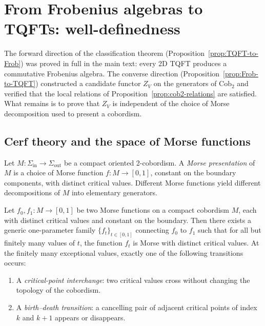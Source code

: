 
\label{app:frobenius}

\section{From Frobenius algebras to TQFTs: well-definedness}\label{appsec:frob-to-tqft}

The forward direction of the classification theorem (Proposition~\ref{prop:TQFT-to-Frob}) was proved in full in the main text: every 2D TQFT produces a commutative Frobenius algebra. The converse direction (Proposition~\ref{prop:Frob-to-TQFT}) constructed a candidate functor $Z_V$ on the generators of $\mathrm{Cob}_2$ and verified that the local relations of Proposition~\ref{prop:cob2-relations} are satisfied. What remains is to prove that $Z_V$ is independent of the choice of Morse decomposition used to present a cobordism.

\subsection{Cerf theory and the space of Morse functions}

Let $M : \Sigma_{\mathrm{in}} \to \Sigma_{\mathrm{out}}$ be a compact oriented 2-cobordism. A \emph{Morse presentation} of $M$ is a choice of Morse function $f : M \to [0,1]$, constant on the boundary components, with distinct critical values. Different Morse functions yield different decompositions of $M$ into elementary generators.

\begin{theorem}\label{thm:cerf}
Let $f_0, f_1 : M \to [0,1]$ be two Morse functions on a compact cobordism $M$, each with distinct critical values and constant on the boundary. Then there exists a generic one-parameter family $\{f_t\}_{t \in [0,1]}$ connecting $f_0$ to $f_1$ such that for all but finitely many values of $t$, the function $f_t$ is Morse with distinct critical values. At the finitely many exceptional values, exactly one of the following transitions occurs:
\begin{enumerate}
\item A \emph{critical-point interchange}: two critical values cross without changing the topology of the cobordism.
\item A \emph{birth--death transition}: a cancelling pair of adjacent critical points of index $k$ and $k+1$ appears or disappears.
\end{enumerate}
\end{theorem}

